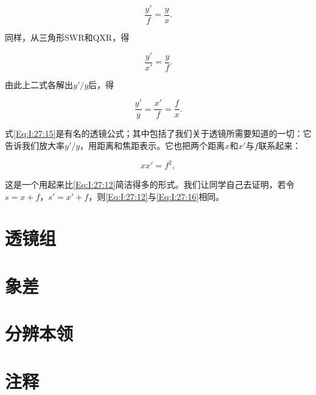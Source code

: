 \documentclass[11pt,oneside]{book}
\begin{document}
\begin{common-format}
\begin{equation}
\label{Eq:I:27:13}
\frac{y'}{f}=\frac{y}{x}.
\end{equation}

同样，从三角形SWR和QXR，得

\begin{equation}
\label{Eq:I:27:14}
\frac{y'}{x'}=\frac{y}{f}.
\end{equation}

由此上二式各解出$ y'/y $后，得

\begin{equation}
\label{Eq:I:27:15}
\frac{y'}{y}=\frac{x'}{f}=\frac{f}{x}.
\end{equation}

式\ref{Eq:I:27:15}是有名的透镜公式；其中包括了我们关于透镜所需要知道的一切：它告诉我们放大率$ y'/y $，用距离和焦距表示。它也把两个距离$ x $和$ x' $与$ f $联系起来：

\begin{equation}
\label{Eq:I:27:16}
xx'=f^2,
\end{equation}

这是一个用起来比\ref{Eq:I:27:12}简洁得多的形式。我们让同学自己去证明，若令$ s=x+f $，$ s'=x'+f $，则\ref{Eq:I:27:12}与\ref{Eq:I:27:16}相同。



\section{透镜组}



\section{象差}


\section{分辨本领}


\section{注释}
\showendnotes




\end{common-format}
\end{document}
